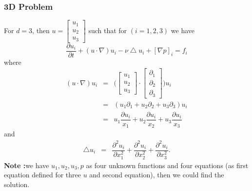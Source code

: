 \documentclass[a4paper,10pt]{article}
\begin{document}
\subsubsection{3D Problem}
For $ d=3 $, then $ u = \left[ {\begin{array}{c} u_{1} \\ u_{2} \\ u_{3}
\end{array} } \right] $ such that for $ (i=1,2,3) $ we have
\[ \dfrac{\partial u_{i}}{\partial t} + (u \cdot \nabla) u_{i} - \nu \bigtriangleup u_{i} + [\nabla p]_{i} = f_{i} \]
where
\begin{eqnarray}\nonumber
(u \cdot \nabla) u_{i} &=& \Big( \left[ 
\begin{array}{c}
u_{1} \\ u_{2} \\ u_{3}
\end{array} 
\right] \cdot \left[
\begin{array}{c}
\partial_{1} \\ \partial_{2} \\ \partial_{3}
\end{array}
\right] \Big) u_{i} \\ \nonumber
&=& (u_{1} \partial_{1} + u_{2} \partial_{2} + u_{3} \partial_{3}) u_{i} \\ \nonumber
&=& u_{1}\dfrac{\partial u_{i}}{x_{1}} + u_{2}\dfrac{\partial u_{i}}{x_{2}} + u_{3}\dfrac{\partial u_{i}}{x_{3}}
\end{eqnarray}
and
\begin{eqnarray} \nonumber
\bigtriangleup u_{i} &=& \dfrac{\partial^{2}u_{i}}{\partial x_{1}^2} + \dfrac{\partial^{2}u_{i}}{\partial x_{2}^2} + \dfrac{\partial^{2}u_{i}}{\partial x_{3}^2}.
\end{eqnarray}
\textbf{Note :}we have $ u_{1}, u_{2}, u_{3}, p $ as four unknown functions and four equations (as first equation defined for three $ u $ and second equation), then we could find the solution.
\end{document}
